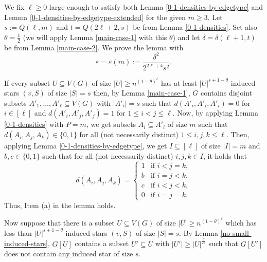 \documentclass[11pt]{article}
\let\oldendproof\endproof
\renewenvironment{proof}[1][\proofname]{%
	\oldproof[\bf #1]%
}{\oldendproof}
\theoremstyle{plain}
\begin{document}
\begin{proof}
    We fix $\ell \geq 0$ large enough to satisfy both Lemma \ref{0-1-densities-by-edgetype} and Lemma \ref{0-1-densities-by-edgetype-extended} for the given $m \geq 3$. Let $s := Q(\ell,m)$ and $t=Q(2\ell+2,s)$ be from Lemma \ref{0-1-densities}. Set also $\theta = \frac{1}{2}$ (we will apply Lemma \ref{main-case-1} with this $\theta$) and let 
    $\delta = \delta(\ell+1,t)$ be from Lemma \ref{main-case-2}. We prove the lemma with
    $$
    \varepsilon = \varepsilon(m) := \frac{\delta^2}{2^{2\ell+4} s^2}.
    $$

    If every subset $U \subseteq V(G)$ of size $|U| \geq n^{(1-\theta)^{\ell}}$ has at least $|U|^{s+1-\theta}$ induced stars $(v,S)$ of size $|S| = s$ then, by Lemma \ref{main-case-1}, $G$ contains disjoint subsets $A'_1,\dots,A'_{\ell} \subseteq V(G)$ with $|A'_i|=s$ such that $d(A'_i,A'_i,A'_i)=0$ for $i \in [\ell]$ and $d(A'_i,A'_j,A'_j)=1$ for $1\leq i < j \leq \ell$. Now, by applying Lemma \ref{0-1-densities} with $P=m$, we get subsets $A_i \subseteq A'_i$ of size $m$ such that $d(A_i,A_j,A_k) \in \{0,1\}$ for all (not necessarily distinct) $1 \leq i,j,k \leq \ell$. Then, applying Lemma \ref{0-1-densities-by-edgetype}, we get $I \subseteq [\ell]$ of size $|I|=m$ and $b,c \in \{0,1\}$ such that for all (not necessarily distinct) $i,j,k \in I$, it holds that
    $$d(A_i,A_j,A_k) = \begin{cases}
    1 &\text{if } i<j=k,\\
    b &\text{if } i=j<k,\\
    c &\text{if } i<j<k,\\
    0 &\text{if } i=j=k.
    \end{cases}$$
    Thus, Item (a) in the lemma holds. 

    Now suppose that there is a subset $U \subseteq V(G)$ of size $|U| \geq n^{(1-\theta)^{\ell}}$ which has less than $|U|^{s+1-\theta}$ induced stars $(v,S)$ of size $|S| = s$. By Lemma \ref{no-small-induced-stars}, $G[U]$ contains a subset $U' \subseteq U$ with $|U'| \geq |U|^{\frac{\theta}{2s}}$ such that $G[U']$ does not contain any induced star of size $s$. 
    

\end{proof}
\end{document}
